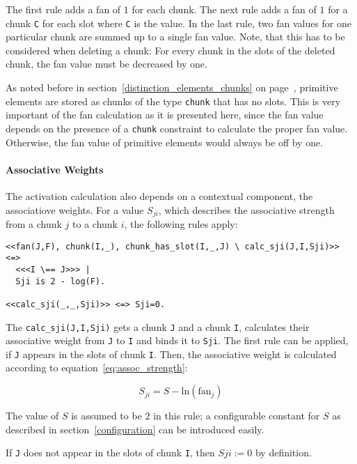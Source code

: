 The first rule adds a fan of $1$ for each chunk. The next rule adds a fan of $1$ for a chunk \verb|C| for each slot where \verb|C| is the value. In the last rule, two fan values for one particular chunk are summed up to a single fan value. Note, that this has to be considered when deleting a chunk: For every chunk in the slots of the deleted chunk, the fan value must be decreased by one.

As noted before in section~\ref{distinction_elements_chunks} on page~\pageref{distinction_elements_chunks}, primitive elements are stored as chunks of the type \verb|chunk| that has no slots. This is very important of the fan calculation as it is presented here, since the fan value depends on the presence of a \verb|chunk| constraint to calculate the proper fan value. Otherwise, the fan value of primitive elements would always be off by one.

\paragraph{Associative Weights}

The activation calculation also depends on a contextual component, the associatiove weights. For a value $S_{ji}$, which describes the associative strength from a chunk $j$ to a chunk $i$, the following rules apply:

\begin{lstlisting}
<<fan(J,F), chunk(I,_), chunk_has_slot(I,_,J) \ calc_sji(J,I,Sji)>> <=> 
  <<<I \== J>>> | 
  Sji is 2 - log(F).

<<calc_sji(_,_,Sji)>> <=> Sji=0.
\end{lstlisting}

The \verb|calc_sji(J,I,Sji)| gets a chunk \verb|J| and a chunk \verb|I|, calculates their associative weight from \verb|J| to \verb|I| and binds it to \verb|Sji|. The first rule can be applied, if \verb|J| appears in the slots of chunk \verb|I|. Then, the associative weight is calculated according to equation~\eqref{eq:assoc_strength}:

\begin{equation*}
S_{ji} = S - \mathrm{ln}(\mathrm{fan}_j) 
\end{equation*}

The value of $S$ is assumed to be $2$ in this rule; a configurable constant for $S$ as described in section~\ref{configuration} can be introduced easily.

If \verb|J| does not appear in the slots of chunk \verb|I|, then $S{ji} := 0$ by definition.

